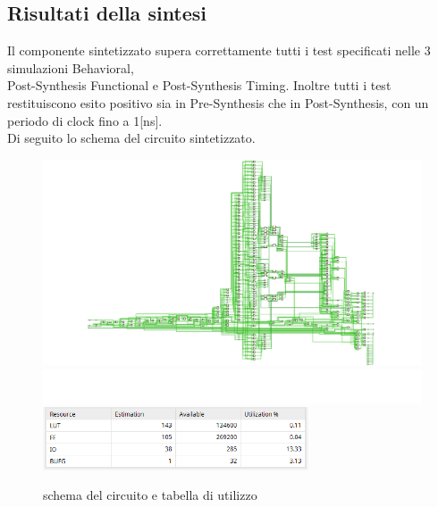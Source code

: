 \documentclass{article}
\begin{document}
\subsection{Risultati della sintesi}
Il componente sintetizzato supera correttamente tutti i test specificati nelle 3 simulazioni Behavioral, \\Post-Synthesis Functional e Post-Synthesis Timing. Inoltre tutti i test restituiscono esito positivo sia in Pre-Synthesis che in Post-Synthesis, con un periodo di clock fino a 1[ns].\\ Di seguito lo schema del circuito sintetizzato.
\begin{figure}[h]
    \centering
    \includegraphics[width=1\textwidth]{schema}
    \includegraphics[width=1\textwidth]{spazio}
    \includegraphics[width=0.7\textwidth]{utilizzo}
    \caption{schema del circuito e tabella di utilizzo}
\end{figure}
\end{document}
